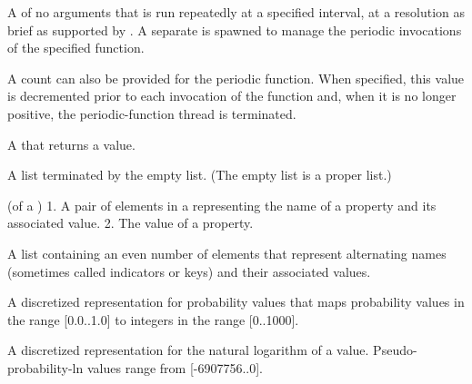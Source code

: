 \begin{glossary-list}
A  of no arguments that is run repeatedly at a specified
interval, at a resolution as brief as supported by . A separate
 is spawned to manage the periodic invocations of the specified
function.

A count can also be provided for the periodic function. When specified, this
value is decremented prior to each invocation of the function and, when it is
no longer positive, the periodic-function thread is terminated.


%
%
%
A  that returns a  value.


%
%
A list terminated by the empty list. (The empty list is a proper list.)


\glent[property]
%
%
(of a ) 1. A pair of elements in a 
representing the name of a property and its associated value. 2. The value of
a property.


%
%
A list containing an even number of elements that represent alternating names
(sometimes called indicators or keys) and their associated values.



A discretized  representation for probability values that
maps probability values in the range [0.0..1.0] to integers in the range
[0..1000].



A discretized  representation for the natural logarithm
of a  value.  Pseudo-probability-ln values range
from [-6907756..0].


\end{glossary-list}
